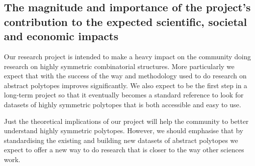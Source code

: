 \subsection{The magnitude and importance of the project’s contribution to the expected scientific, societal and economic impacts}
\label{sec:impactmeasures}

Our research project is intended to make a heavy impact on the community doing research on highly symmetric combinatorial structures.
More particularly we expect that with the success of \ourp the way and methodology used to do research on abstract polytopes improves significantly.
We also expect \ourp to be the first step in a long-term project so that it eventually becomes a standard reference to look for datasets of highly symmetric polytopes that is both accessible and easy to use.

Just the theoretical implications of our project will help the community to better understand highly symmetric polytopes. However, we should emphasise that by standardising the existing and building new datasets of abstract polytopes we expect to offer a new way to do research that is closer to the way other sciences work.

%
%




